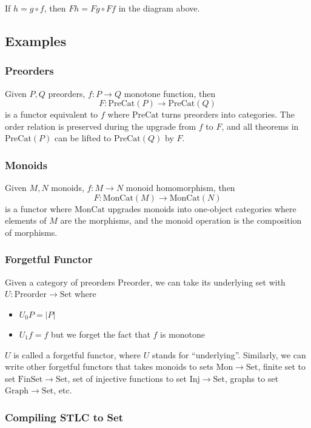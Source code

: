 \documentclass[12pt]{article}
\theoremstyle{plain}
\theoremstyle{definition}
\theoremstyle{remark}
\newcommand{\Set}{\mathrm{Set}}
\begin{document}
If $h = g \circ f$, then $F h = F g \circ F f$ in the diagram above.

\subsection{Examples}

\subsubsection*{Preorders}

Given $P, Q$ preorders, $f: P \rightarrow Q$ monotone function, then
$$F: \mathrm{PreCat}(P) \rightarrow \mathrm{PreCat}(Q)$$ is a functor equivalent to $f$ where $\mathrm{PreCat}$ turns preorders into categories. The order relation is preserved during the upgrade from $f$ to $F$, and all theorems in $\mathrm{PreCat}(P)$ can be lifted to $\mathrm{PreCat}(Q)$ by $F$.

\subsubsection*{Monoids}

Given $M, N$ monoids, $f: M \rightarrow N$ monoid homomorphism, then
$$F: \mathrm{MonCat}(M) \rightarrow \mathrm{MonCat}(N)$$ is a functor where $\mathrm{MonCat}$ upgrades monoids into one-object categories where elements of $M$ are the morphisms, and the monoid operation is the composition of morphisms.

\subsubsection*{Forgetful Functor}

Given a category of preorders $\mathrm{Preorder}$, we can take its underlying set with $U: \mathrm{Preorder} \rightarrow \Set$ where
\begin{itemize}
  \item $U_0 P = |P|$
  \item $U_1 f = f$ but we forget the fact that $f$ is monotone
\end{itemize}

$U$ is called a forgetful functor, where $U$ stands for ``underlying''. Similarly, we can write other forgetful functors that takes 
monoids to sets $\mathrm{Mon} \to \Set$, finite set to set $\mathrm{FinSet} \to \Set$, set of injective functions to set $\mathrm{Inj} \to \Set$, graphs to set $\mathrm{Graph} \to \Set$, etc.

\subsubsection*{Compiling STLC to Set}
\end{document}
